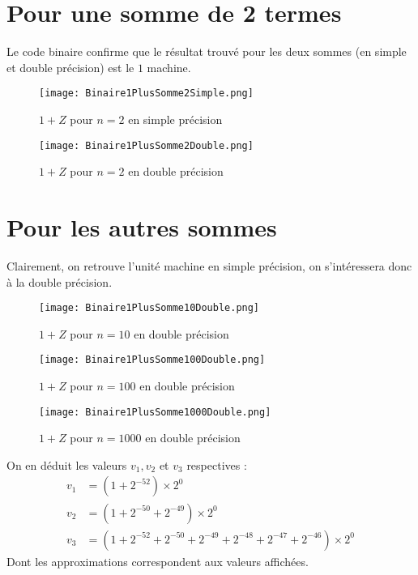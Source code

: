 \documentclass[a4paper, titlepage]{livret} %
\begin{document}
		\section{Pour une somme de 2 termes}
			Le code binaire confirme que le résultat trouvé pour les deux sommes (en simple et double précision) est le $1$ machine.
			\begin{figure}[!h]
				\centering
  					\texttt{[image: Binaire1PlusSomme2Simple.png]}
  					\caption{$1 + Z$ pour $n = 2$ en simple précision}
			\end{figure}
			\begin{figure}[!h]
				\centering
  					\texttt{[image: Binaire1PlusSomme2Double.png]}
  					\caption{$1 + Z$ pour $n = 2$ en double précision}
			\end{figure}

		\section{Pour les autres sommes}
			Clairement, on retrouve l'unité machine en simple précision, on s'intéressera donc à la double précision.
			\begin{figure}[!h]
				\centering
  					\texttt{[image: Binaire1PlusSomme10Double.png]}
  					\caption{$1 + Z$ pour $n = 10$ en double précision}
			\end{figure}
			\begin{figure}[!h]
				\centering
  					\texttt{[image: Binaire1PlusSomme100Double.png]}
  					\caption{$1 + Z$ pour $n = 100$ en double précision}
			\end{figure}
			\begin{figure}[!h]
				\centering
  					\texttt{[image: Binaire1PlusSomme1000Double.png]}
  					\caption{$1 + Z$ pour $n = 1000$ en double précision}
			\end{figure}
			\newpage

			On en déduit les valeurs $v_{1}, v_{2}$ et $v_{3}$ respectives :
			\[\begin{aligned}
				v_{1} & = (1 + 2^{-52}) \times 2^0\\
				v_{2} & = (1 + 2^{-50} + 2^{-49})\times 2^0\\
				v_{3} & = (1 + 2^{-52} + 2^{-50} + 2^{-49} + 2^{-48} + 2^{-47} + 2^{-46})\times 2^0
			\end{aligned}\]
			Dont les approximations correspondent aux valeurs affichées.
\end{document}
